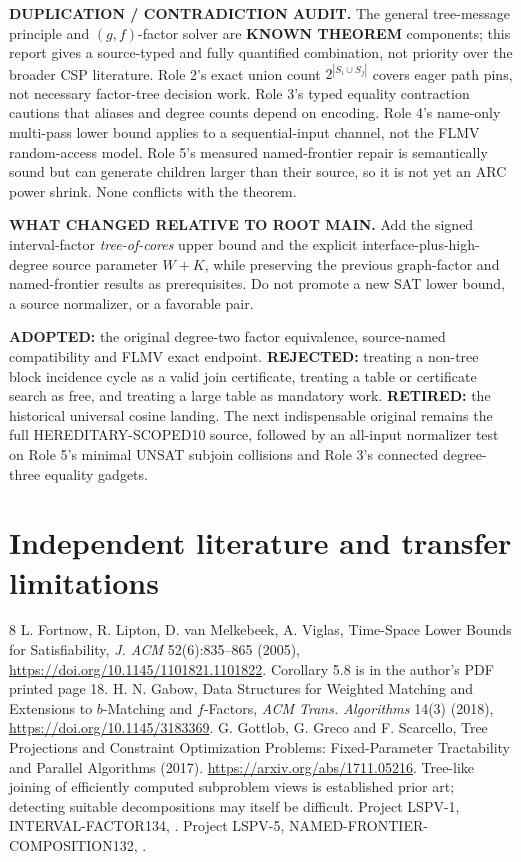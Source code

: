 \documentclass[11pt]{article}
\begin{document}
\textbf{DUPLICATION / CONTRADICTION AUDIT.}
The general tree-message principle and $(g,f)$-factor solver
are \textbf{KNOWN THEOREM} components; this report gives a
source-typed and fully quantified combination, not priority over
the broader CSP literature. Role 2's exact union count
$2^{|S_i\cup S_j|}$ covers eager path pins, not necessary
factor-tree decision work. Role 3's typed equality contraction
cautions that aliases and degree counts depend on encoding.
Role 4's name-only multi-pass lower bound applies to a
sequential-input channel, not the FLMV random-access model.
Role 5's measured named-frontier repair is semantically sound
but can generate children larger than their source, so it is
not yet an ARC power shrink. None conflicts with the theorem.

\textbf{WHAT CHANGED RELATIVE TO ROOT MAIN.}
Add the signed interval-factor \emph{tree-of-cores} upper bound
and the explicit interface-plus-high-degree source parameter
$W+K$, while preserving the previous graph-factor and
named-frontier results as prerequisites. Do not promote a new
SAT lower bound, a source normalizer, or a favorable pair.

\textbf{ADOPTED:} the original degree-two factor equivalence,
source-named compatibility and FLMV exact endpoint.
\textbf{REJECTED:} treating a non-tree block incidence cycle as
a valid join certificate, treating a table or certificate
search as free, and treating a large table as mandatory work.
\textbf{RETIRED:} the historical universal cosine landing.
The next indispensable original remains the full
HEREDITARY-SCOPED10 source, followed by an all-input normalizer
test on Role 5's minimal UNSAT subjoin collisions and Role 3's
connected degree-three equality gadgets.

\section{Independent literature and transfer limitations}
\begin{thebibliography}{8}\small
{} L. Fortnow, R. Lipton, D. van Melkebeek, A. Viglas,
Time-Space Lower Bounds for Satisfiability,
\emph{J. ACM} 52(6):835--865 (2005),
\url{https://doi.org/10.1145/1101821.1101822}.
Corollary 5.8 is in the author's PDF printed page 18.
 H. N. Gabow,
Data Structures for Weighted Matching and Extensions to
$b$-Matching and $f$-Factors, \emph{ACM Trans. Algorithms}
14(3) (2018), \url{https://doi.org/10.1145/3183369}.
 G. Gottlob, G. Greco and F. Scarcello,
Tree Projections and Constraint Optimization Problems:
Fixed-Parameter Tractability and Parallel Algorithms (2017).
\url{https://arxiv.org/abs/1711.05216}.
Tree-like joining of efficiently computed subproblem views
is established prior art; detecting suitable decompositions
may itself be difficult.
 Project LSPV-1, INTERVAL-FACTOR134,
.
 Project LSPV-5, NAMED-FRONTIER-COMPOSITION132,
.
\end{thebibliography}
\end{document}
